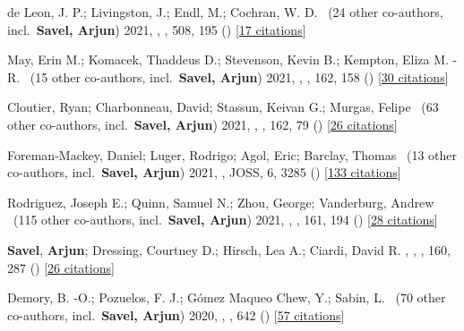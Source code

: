 \item[{\color{numcolor}\scriptsize7}] de Leon, J. P.; Livingston, J.; Endl, M.; Cochran, W. D. \etal\ ({24} other co-authors, incl.\ \textbf{Savel, Arjun}) 2021, , \mnras, {508}, 195 () [\href{https://ui.adsabs.harvard.edu/abs/2021MNRAS.508..195D}{17 citations}]

\item[{\color{numcolor}\scriptsize6}] May, Erin M.; Komacek, Thaddeus D.; Stevenson, Kevin B.; Kempton, Eliza M. -R. \etal\ ({15} other co-authors, incl.\ \textbf{Savel, Arjun}) 2021, , \aj, {162}, 158 () [\href{https://ui.adsabs.harvard.edu/abs/2021AJ....162..158M}{30 citations}]

\item[{\color{numcolor}\scriptsize5}] Cloutier, Ryan; Charbonneau, David; Stassun, Keivan G.; Murgas, Felipe \etal\ ({63} other co-authors, incl.\ \textbf{Savel, Arjun}) 2021, , \aj, {162}, 79 () [\href{https://ui.adsabs.harvard.edu/abs/2021AJ....162...79C}{26 citations}]

\item[{\color{numcolor}\scriptsize4}] Foreman-Mackey, Daniel; Luger, Rodrigo; Agol, Eric; Barclay, Thomas \etal\ ({13} other co-authors, incl.\ \textbf{Savel, Arjun}) 2021, , JOSS, {6}, 3285 () [\href{https://ui.adsabs.harvard.edu/abs/2021JOSS....6.3285F}{133 citations}]

\item[{\color{numcolor}\scriptsize3}] Rodriguez, Joseph E.; Quinn, Samuel N.; Zhou, George; Vanderburg, Andrew \etal\ ({115} other co-authors, incl.\ \textbf{Savel, Arjun}) 2021, , \aj, {161}, 194 () [\href{https://ui.adsabs.harvard.edu/abs/2021AJ....161..194R}{28 citations}]

\item[{\color{numcolor}\scriptsize2}] \textbf{Savel}, \textbf{Arjun}; Dressing, Courtney D.; Hirsch, Lea A.; Ciardi, David R. , , \aj, {160}, 287 () [\href{https://ui.adsabs.harvard.edu/abs/2020AJ....160..287S}{26 citations}]

\item[{\color{numcolor}\scriptsize1}] Demory, B. -O.; Pozuelos, F. J.; G{\'o}mez Maqueo Chew, Y.; Sabin, L. \etal\ ({70} other co-authors, incl.\ \textbf{Savel, Arjun}) 2020, , \aanda, {642} () [\href{https://ui.adsabs.harvard.edu/abs/2020A&A...642A..49D}{57 citations}]